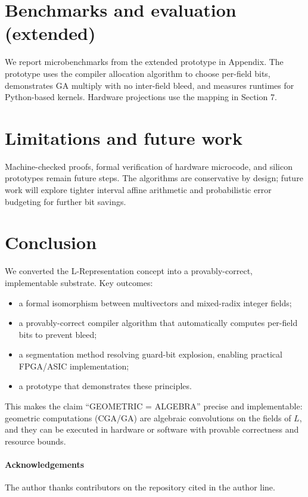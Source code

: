 \documentclass[11pt]{article}
\theoremstyle{definition}
\theoremstyle{plain}
\begin{document}
\section{Benchmarks and evaluation (extended)}
We report microbenchmarks from the extended prototype in Appendix. The prototype uses the compiler allocation algorithm to choose per-field bits, demonstrates GA multiply with no inter-field bleed, and measures runtimes for Python-based kernels. Hardware projections use the mapping in Section 7.

\section{Limitations and future work}
Machine-checked proofs, formal verification of hardware microcode, and silicon prototypes remain future steps. The algorithms are conservative by design; future work will explore tighter interval affine arithmetic and probabilistic error budgeting for further bit savings.

\section{Conclusion}
We converted the L-Representation concept into a provably-correct, implementable substrate. Key outcomes:
\begin{itemize}
  \item a formal isomorphism between multivectors and mixed-radix integer fields;
  \item a provably-correct compiler algorithm that automatically computes per-field bits to prevent bleed;
  \item a segmentation method resolving guard-bit explosion, enabling practical FPGA/ASIC implementation;
  \item a prototype that demonstrates these principles.
\end{itemize}
This makes the claim ``GEOMETRIC = ALGEBRA'' precise and implementable: geometric computations (CGA/GA) are algebraic convolutions on the fields of \(L\), and they can be executed in hardware or software with provable correctness and resource bounds.

\paragraph{Acknowledgements} The author thanks contributors on the repository cited in the author line.
\end{document}
